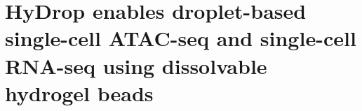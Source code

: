\documentclass[a4paper,11pt,twoside]{book}
\newif\ifthesisprintcoveronly
\newif\ifthesisprintcontentonly
\begin{document}
\frontmatter

\ifthesisprintcontentonly
\else
	
\fi

\ifthesisprintcoveronly
\else
	\ifthesisprintcontentonly
	\else
		\cleardoublepage
	\fi


\tableofcontents %
\clearpage
\listoffigures
\markboth{}{}


\begingroup
\makeatletter
\let\origps@plain\ps@plain
\let\ps@plain\ps@fancy
\makeatother

\let\origcleardoublepage\cleardoublepage
\let\cleardoublepage\clearpage







\let\cleardoublepage\origcleardoublepage
\makeatletter
\let\ps@plain\origps@plain
\makeatother
\endgroup

\mainmatter{}


\cleardoublepage
\begingroup
\makeatletter \addtolength{\hoffset}{-\textblockoffset} \makeatother


\cleardoublepage
\chapter{HyDrop enables droplet-based single-cell ATAC-seq and single-cell RNA-seq using dissolvable hydrogel beads}
\label{app:hydrop}
\end{document}
